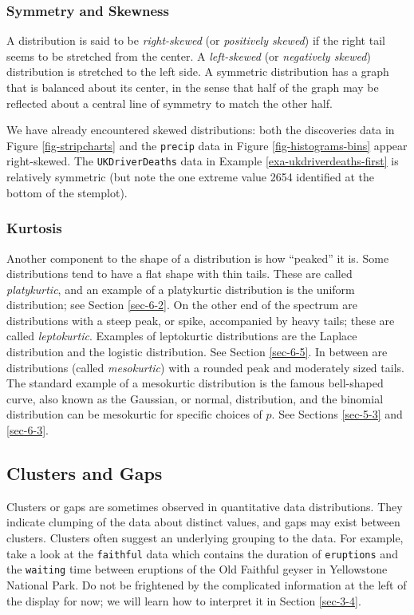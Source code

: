 \documentclass[captions=tableheading]{scrbook}
\begin{document}
\subsubsection{Symmetry and Skewness}
\label{sec-3-2-3-1}


A distribution is said to be \emph{right-skewed} (or \emph{positively skewed}) if the right tail seems to be stretched from the center. A \emph{left-skewed} (or \emph{negatively skewed}) distribution is stretched to the left side. A symmetric distribution has a graph that is balanced about its center, in the sense that half of the graph may be reflected about a central line of symmetry to match the other
half.

We have already encountered skewed distributions: both the discoveries data in Figure \ref{fig-stripcharts} and the \texttt{precip} data in Figure \ref{fig-histograms-bins} appear right-skewed. The \texttt{UKDriverDeaths} data in Example \ref{exa-ukdriverdeaths-first} is relatively symmetric (but note the one extreme value 2654 identified at the bottom of the stemplot).
\subsubsection{Kurtosis}
\label{sec-3-2-3-2}


Another component to the shape of a distribution is how ``peaked'' it is. Some distributions tend to have a flat shape with thin tails. These are called \emph{platykurtic}, and an example of a platykurtic distribution is the uniform distribution; see Section \ref{sec-6-2}. On the other end of the spectrum are distributions with a steep peak, or spike, accompanied by heavy tails; these are called \emph{leptokurtic}. Examples of leptokurtic distributions are the Laplace distribution and the logistic distribution. See Section \ref{sec-6-5}. In between are distributions (called \emph{mesokurtic}) with a rounded peak and moderately sized tails. The standard example of a mesokurtic distribution is the famous bell-shaped curve, also known as the Gaussian, or normal, distribution, and the binomial distribution can be mesokurtic for specific choices of \(p\). See Sections \ref{sec-5-3} and \ref{sec-6-3}.
\subsection{Clusters and Gaps}
\label{sec-3-2-4}
\label{sub-clusters-and-gaps}


Clusters or gaps are sometimes observed in quantitative data distributions. They indicate clumping of the data about distinct values, and gaps may exist between clusters. Clusters often suggest an underlying grouping to the data. For example, take a look at the \texttt{faithful} data which contains the duration of \texttt{eruptions} and the \texttt{waiting} time between eruptions of the Old Faithful geyser in Yellowstone National Park. Do not be frightened by the complicated information at the left of the display for now; we will learn how to interpret it in Section \ref{sec-3-4}.
\end{document}
